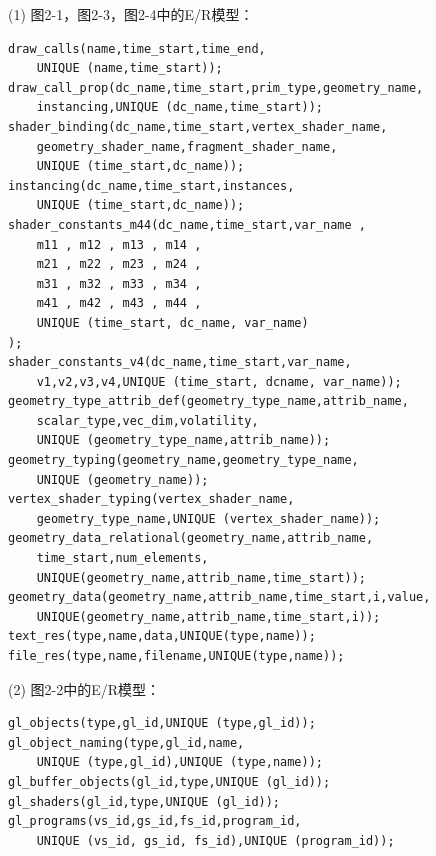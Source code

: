 \documentclass[12pt,a4paper]{article}
\begin{document}
\noindent (1) 图2-1，图2-3，图2-4中的E/R模型：
\begin{lstlisting}
draw_calls(name,time_start,time_end,
	UNIQUE (name,time_start));
draw_call_prop(dc_name,time_start,prim_type,geometry_name,
	instancing,UNIQUE (dc_name,time_start));
shader_binding(dc_name,time_start,vertex_shader_name,
	geometry_shader_name,fragment_shader_name,
	UNIQUE (time_start,dc_name));
instancing(dc_name,time_start,instances,
	UNIQUE (time_start,dc_name));
shader_constants_m44(dc_name,time_start,var_name ,
	m11 , m12 , m13 , m14 , 
	m21 , m22 , m23 , m24 , 
	m31 , m32 , m33 , m34 ,
	m41 , m42 , m43 , m44 ,
	UNIQUE (time_start, dc_name, var_name) 
);
shader_constants_v4(dc_name,time_start,var_name,
	v1,v2,v3,v4,UNIQUE (time_start, dcname, var_name));
geometry_type_attrib_def(geometry_type_name,attrib_name,
	scalar_type,vec_dim,volatility,
	UNIQUE (geometry_type_name,attrib_name));
geometry_typing(geometry_name,geometry_type_name,
	UNIQUE (geometry_name));
vertex_shader_typing(vertex_shader_name,
	geometry_type_name,UNIQUE (vertex_shader_name));
geometry_data_relational(geometry_name,attrib_name,
	time_start,num_elements,
	UNIQUE(geometry_name,attrib_name,time_start));
geometry_data(geometry_name,attrib_name,time_start,i,value,
	UNIQUE(geometry_name,attrib_name,time_start,i));
text_res(type,name,data,UNIQUE(type,name));
file_res(type,name,filename,UNIQUE(type,name));
\end{lstlisting}

\newpage
\noindent (2) 图2-2中的E/R模型：
\begin{lstlisting}
gl_objects(type,gl_id,UNIQUE (type,gl_id));
gl_object_naming(type,gl_id,name,
	UNIQUE (type,gl_id),UNIQUE (type,name));
gl_buffer_objects(gl_id,type,UNIQUE (gl_id));
gl_shaders(gl_id,type,UNIQUE (gl_id));
gl_programs(vs_id,gs_id,fs_id,program_id,
	UNIQUE (vs_id, gs_id, fs_id),UNIQUE (program_id));
\end{lstlisting}
\end{document}
